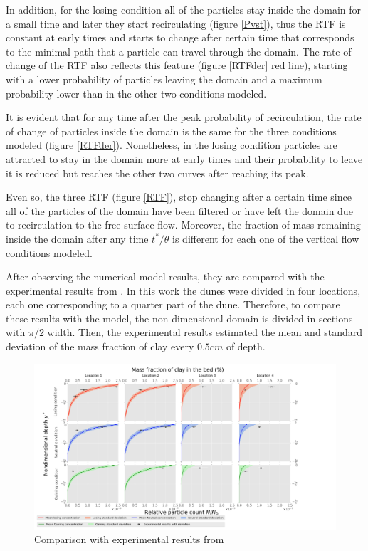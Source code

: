 \documentclass[draft,linenumbers]{agujournal2018}
\begin{document}
In addition, for the losing condition all of the particles stay inside the domain for a small time and later they start recirculating (figure \ref{Pvst}), thus the RTF is constant at early times and starts to change after certain time that corresponds to the minimal path that a particle can travel through the domain. The rate of change of the RTF also reflects this feature (figure \ref{RTFder} red line), starting with a lower probability of particles leaving the domain and a maximum probability lower than in the other two conditions modeled. 

It is evident that for any time after the peak probability of recirculation, the rate of change of particles inside the domain is the same for the three conditions modeled (figure \ref{RTFder}). Nonetheless, in the losing condition particles are attracted to stay in the domain more at early times and their probability to leave it is reduced but reaches the other two curves after reaching its peak.

Even so, the three RTF (figure \ref{RTF}), stop changing after a certain time since all of the particles of the domain have been filtered or have left the domain due to recirculation to the free surface flow. Moreover, the fraction of mass remaining inside the domain after any time $t^*/\theta$ is different for each one of the vertical flow conditions modeled. 

After observing the numerical model results, they are compared with the experimental results from \citet{Fox2014,Fox2018}. In this work the dunes were divided in four locations, each one corresponding to a quarter part of the dune. Therefore, to compare these results with the model, the non-dimensional domain is divided in sections with $\pi/2$ width. Then, the experimental results estimated the mean and standard deviation of the mass fraction of clay every $0.5cm$ of depth. 

\begin{figure}
\centering
\includegraphics[trim=0.2cm 0.2cm 0.2cm 0.2cm, width=65pc]
{190131_Comparing.pdf}
\caption{Comparison with experimental results from \citep{Fox2018}}
\label{Comparison}
\end{figure}
\end{document}
